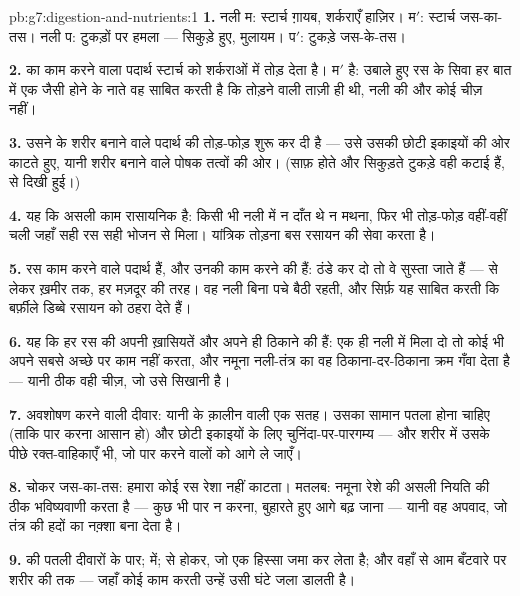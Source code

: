\begin{solution}{pb:g7:digestion-and-nutrients:1}
\textbf{1.} नली म: स्टार्च ग़ायब, शर्कराएँ हाज़िर। म$'$: स्टार्च
जस-का-तस। नली प: टुकड़ों पर हमला --- सिकुड़े हुए, मुलायम। प$'$: टुकड़े
जस-के-तस।

\textbf{2.}  का काम करने वाला पदार्थ स्टार्च को शर्कराओं में तोड़
देता है। म$'$  है: उबाले हुए रस के सिवा हर बात में एक जैसी होने
के नाते वह साबित करती है कि तोड़ने वाली ताज़ी  ही थी, नली की और कोई
चीज़ नहीं।

\textbf{3.} उसने  के शरीर बनाने वाले पदार्थ की तोड़-फोड़ शुरू कर दी
है --- उसे उसकी छोटी इकाइयों की ओर काटते हुए, यानी शरीर बनाने वाले पोषक
तत्वों की ओर। (साफ़ होते और सिकुड़ते टुकड़े वही कटाई हैं,  से दिखी
हुई।)

\textbf{4.} यह कि असली काम रासायनिक है: किसी भी नली में न दाँत थे न
मथना, फिर भी तोड़-फोड़ वहीं-वहीं चली जहाँ सही रस सही भोजन से मिला।
यांत्रिक तोड़ना बस रसायन की सेवा करता है।

\textbf{5.} रस काम करने वाले पदार्थ हैं, और उनकी काम करने की
 हैं: ठंडे कर दो तो वे सुस्ता जाते हैं ---  से लेकर
ख़मीर तक, हर मज़दूर की तरह। वह नली बिना पचे बैठी रहती, और सिर्फ़ यह
साबित करती कि बर्फ़ीले डिब्बे रसायन को ठहरा देते हैं।

\textbf{6.} यह कि हर रस की अपनी ख़ासियतें और अपने ही ठिकाने की
 हैं: एक ही नली में मिला दो तो कोई भी अपने सबसे अच्छे पर
काम नहीं करता, और नमूना नली-तंत्र का वह ठिकाना-दर-ठिकाना क्रम गँवा देता
है --- यानी ठीक वही चीज़, जो उसे सिखानी है।

\textbf{7.} अवशोषण करने वाली दीवार: यानी  के क़ालीन वाली एक
सतह। उसका सामान पतला होना चाहिए (ताकि पार करना आसान हो) और छोटी इकाइयों
के लिए चुनिंदा-पर-पारगम्य --- और शरीर में उसके पीछे रक्त-वाहिकाएँ भी,
जो पार करने वालों को आगे ले जाएँ।

\textbf{8.} चोकर जस-का-तस: हमारा कोई रस रेशा नहीं काटता। मतलब: नमूना
रेशे की असली नियति की ठीक भविष्यवाणी करता है --- कुछ भी पार न करना,
बुहारते हुए आगे बढ़ जाना --- यानी वह अपवाद, जो तंत्र की हदों का नक़्शा
बना देता है।

\textbf{9.}  की पतली दीवारों के पार;  में;  से होकर,
जो एक हिस्सा जमा कर लेता है; और वहाँ से आम बँटवारे पर शरीर की 
तक --- जहाँ कोई काम करती  उन्हें उसी घंटे जला डालती है।


\end{solution}
